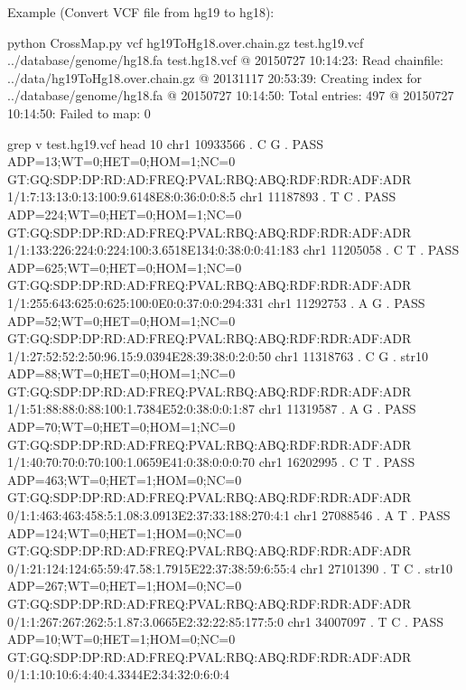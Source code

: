 \documentclass[letterpaper,10pt,english]{sphinxmanual}
\begin{document}
Example (Convert VCF file from hg19 to hg18):

\begin{sphinxVerbatim}[commandchars=\\\{\}]
\PYGZdl{} python CrossMap.py vcf hg19ToHg18.over.chain.gz test.hg19.vcf ../database/genome/hg18.fa  test.hg18.vcf
@ 2015\PYGZhy{}07\PYGZhy{}27 10:14:23: Read chain\PYGZus{}file:  ../data/hg19ToHg18.over.chain.gz
@ 2013\PYGZhy{}11\PYGZhy{}17 20:53:39: Creating index for ../database/genome/hg18.fa
@ 2015\PYGZhy{}07\PYGZhy{}27 10:14:50: Total entries: 497
@ 2015\PYGZhy{}07\PYGZhy{}27 10:14:50: Failed to map: 0

\PYGZdl{} grep \PYGZhy{}v \PYGZsq{}\PYGZsh{}\PYGZsq{} test.hg19.vcf  \textbar{}head \PYGZhy{}10
chr1   10933566        .       C       G       .       PASS    ADP=13;WT=0;HET=0;HOM=1;NC=0    GT:GQ:SDP:DP:RD:AD:FREQ:PVAL:RBQ:ABQ:RDF:RDR:ADF:ADR    1/1:7:13:13:0:13:100\PYGZpc{}:9.6148E\PYGZhy{}8:0:36:0:0:8:5
chr1   11187893        .       T       C       .       PASS    ADP=224;WT=0;HET=0;HOM=1;NC=0   GT:GQ:SDP:DP:RD:AD:FREQ:PVAL:RBQ:ABQ:RDF:RDR:ADF:ADR    1/1:133:226:224:0:224:100\PYGZpc{}:3.6518E\PYGZhy{}134:0:38:0:0:41:183
chr1   11205058        .       C       T       .       PASS    ADP=625;WT=0;HET=0;HOM=1;NC=0   GT:GQ:SDP:DP:RD:AD:FREQ:PVAL:RBQ:ABQ:RDF:RDR:ADF:ADR    1/1:255:643:625:0:625:100\PYGZpc{}:0E0:0:37:0:0:294:331
chr1   11292753        .       A       G       .       PASS    ADP=52;WT=0;HET=0;HOM=1;NC=0    GT:GQ:SDP:DP:RD:AD:FREQ:PVAL:RBQ:ABQ:RDF:RDR:ADF:ADR    1/1:27:52:52:2:50:96.15\PYGZpc{}:9.0394E\PYGZhy{}28:39:38:0:2:0:50
chr1   11318763        .       C       G       .       str10   ADP=88;WT=0;HET=0;HOM=1;NC=0    GT:GQ:SDP:DP:RD:AD:FREQ:PVAL:RBQ:ABQ:RDF:RDR:ADF:ADR    1/1:51:88:88:0:88:100\PYGZpc{}:1.7384E\PYGZhy{}52:0:38:0:0:1:87
chr1   11319587        .       A       G       .       PASS    ADP=70;WT=0;HET=0;HOM=1;NC=0    GT:GQ:SDP:DP:RD:AD:FREQ:PVAL:RBQ:ABQ:RDF:RDR:ADF:ADR    1/1:40:70:70:0:70:100\PYGZpc{}:1.0659E\PYGZhy{}41:0:38:0:0:0:70
chr1   16202995        .       C       T       .       PASS    ADP=463;WT=0;HET=1;HOM=0;NC=0   GT:GQ:SDP:DP:RD:AD:FREQ:PVAL:RBQ:ABQ:RDF:RDR:ADF:ADR    0/1:1:463:463:458:5:1.08\PYGZpc{}:3.0913E\PYGZhy{}2:37:33:188:270:4:1
chr1   27088546        .       A       T       .       PASS    ADP=124;WT=0;HET=1;HOM=0;NC=0   GT:GQ:SDP:DP:RD:AD:FREQ:PVAL:RBQ:ABQ:RDF:RDR:ADF:ADR    0/1:21:124:124:65:59:47.58\PYGZpc{}:1.7915E\PYGZhy{}22:37:38:59:6:55:4
chr1   27101390        .       T       C       .       str10   ADP=267;WT=0;HET=1;HOM=0;NC=0   GT:GQ:SDP:DP:RD:AD:FREQ:PVAL:RBQ:ABQ:RDF:RDR:ADF:ADR    0/1:1:267:267:262:5:1.87\PYGZpc{}:3.0665E\PYGZhy{}2:32:22:85:177:5:0
chr1   34007097        .       T       C       .       PASS    ADP=10;WT=0;HET=1;HOM=0;NC=0    GT:GQ:SDP:DP:RD:AD:FREQ:PVAL:RBQ:ABQ:RDF:RDR:ADF:ADR    0/1:1:10:10:6:4:40\PYGZpc{}:4.3344E\PYGZhy{}2:34:32:0:6:0:4


\end{sphinxVerbatim}
\end{document}
